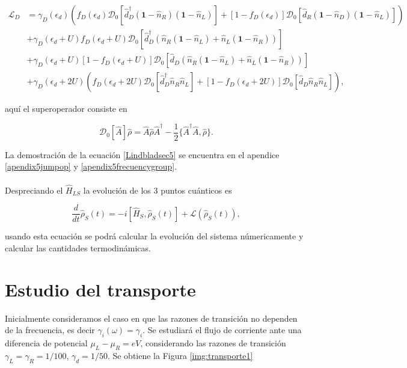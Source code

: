 \begin{align*}
    \mathcal{L}_{D} & = \gamma_{D}(\epsilon_{d})(f_{D}(\epsilon_{d})\mathcal{D}_{0}[\hat{d}^{\dagger}_{D}(\textbf{1}-\hat{n}_{R})(\textbf{1}-\hat{n}_{L}) ]  + [1-f_{D}(\epsilon_{d})]\mathcal{D}_{0}[\hat{d}_{R}(\textbf{1}-\hat{n}_{D})(\textbf{1}-\hat{n}_{L}) ]  )  \\
                    & + \gamma_{D}(\epsilon_{d}+U)f_{D}(\epsilon_{d}+U)\mathcal{D}_{0}[\hat{d}^{\dagger}_{D}(\hat{n}_{R}(\textbf{1}-\hat{n}_{L}) + \hat{n}_{L}(\textbf{1}-\hat{n}_{R})) ]  \\
                    & + \gamma_{D}(\epsilon_{d}+U)[1-f_{D}(\epsilon_{d}+U)]\mathcal{D}_{0}[\hat{d}_{D}(\hat{n}_{R}(\textbf{1}-\hat{n}_{L}) + \hat{n}_{L}(\textbf{1}-\hat{n}_{R}))]   \\
                   & + \gamma_{D}(\epsilon_{d}+2U)(f_{D}(\epsilon_{d}+2U)\mathcal{D}_{0}[\hat{d}^{\dagger}_{D}\hat{n}_{R}\hat{n}_{L} ]  + [1-f_{D}(\epsilon_{d}+2U)]\mathcal{D}_{0}[\hat{d}_{D}\hat{n}_{R}\hat{n}_{L} ]  ),   
\end{align*}

aquí el superoperador consiste en 

\begin{equation*}
    \mathcal{D}_{0}[\hat{A}]\hat{\rho} = \hat{A}\hat{\rho}\hat{A}^{\dagger}- \frac{1}{2} \{\hat{A }^{\dagger}\hat{A},\hat{\rho} \}.
\end{equation*}

La demostración de la ecuación \ref{Lindbladsec5} se encuentra en el apendice \ref{apendix5jumpop} y \ref{apendix5frecuencygroup}.\\
\\
Despreciando el $\hat{H}_{LS}$ \cite{prech2023entanglement} la evolución de los 3 puntos cuánticos es

\begin{equation*}
    \frac{d}{dt}\hat{\rho}_{S}(t) = -i[\hat{H}_{S},\hat{\rho}_{S}(t)] + \mathcal{L}(\hat{\rho}_{S}(t)),
\end{equation*}

usando esta ecuación se podrá calcular la evolución del sistema númericamente y calcular las cantidades termodinámicas.


\label{sec5:modelo}

\newpage

\section{Estudio del transporte}
Inicialmente consideramos el caso en que las razones de transición no dependen de la frecuencia, es decir $\gamma_{i}(\omega) = \gamma_{i}$. Se estudiará el flujo de corriente ante una diferencia de potencial $\mu_{L}-\mu_{R} = eV$, considerando las razones de transición $\gamma_{L}=\gamma_{R}=1/100$, $\gamma_{d}=1/50$. Se obtiene la Figura \ref{img:transporte1}

